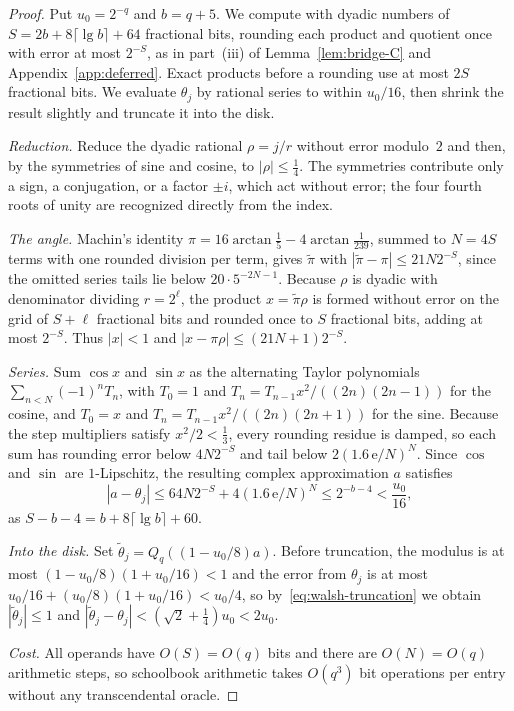 \begin{proof}
Put $u_0=2^{-q}$ and $b=q+5$. We compute with dyadic numbers of $S=2b+8\lceil\lg b\rceil+64$ fractional bits, rounding
each product and quotient once with error at most $2^{-S}$, as in part~(iii) of Lemma~\ref{lem:bridge-C} and
Appendix~\ref{app:deferred}. Exact products before a rounding use at most $2S$ fractional bits. We evaluate $\theta_j$
by rational series to within $u_0/16$, then shrink the result slightly and truncate it into the disk.

\emph{Reduction.} Reduce the dyadic rational $\rho=j/r$ without error modulo~$2$ and then, by the symmetries of sine and
cosine, to $|\rho|\le\frac14$. The symmetries contribute only a sign, a conjugation, or a factor $\pm i$, which act
without error; the four fourth roots of unity are recognized directly from the index.

\emph{The angle.} Machin's identity $\pi=16\arctan\frac15-4\arctan\frac1{239}$, summed to $N=4S$ terms with one rounded
division per term, gives $\tilde\pi$ with $|\tilde\pi-\pi|\le21N2^{-S}$, since the omitted series tails lie below
$20\cdot5^{-2N-1}$. Because $\rho$ is dyadic with denominator dividing $r=2^\ell$, the product $x=\tilde\pi\rho$ is
formed without error on the grid of $S+\ell$ fractional bits and rounded once to $S$ fractional bits, adding at most
$2^{-S}$. Thus $|x|<1$ and $|x-\pi\rho|\le(21N+1)2^{-S}$.

\emph{Series.} Sum $\cos x$ and $\sin x$ as the alternating Taylor polynomials $\sum_{n<N}(-1)^nT_n$, with $T_0=1$ and
$T_n=T_{n-1}x^2/((2n)(2n-1))$ for the cosine, and $T_0=x$ and $T_n=T_{n-1}x^2/((2n)(2n+1))$ for the sine. Because the
step multipliers satisfy $x^2/2<\frac13$, every rounding residue is damped, so each sum has rounding error below
$4N2^{-S}$ and tail below $2(1.6\,\mathrm e/N)^N$. Since $\cos$ and $\sin$ are $1$-Lipschitz, the resulting complex
approximation $a$ satisfies
\[
  |a-\theta_j|\le64N2^{-S}+4(1.6\,\mathrm e/N)^N\le2^{-b-4}<\frac{u_0}{16},
\]
as $S-b-4=b+8\lceil\lg b\rceil+60$.

\emph{Into the disk.} Set $\tilde\theta_j=Q_q((1-u_0/8)a)$. Before truncation, the modulus is at most
$(1-u_0/8)(1+u_0/16)<1$ and the error from $\theta_j$ is at most $u_0/16+(u_0/8)(1+u_0/16)<u_0/4$, so
by~\eqref{eq:walsh-truncation} we obtain $|\tilde\theta_j|\le1$ and
$|\tilde\theta_j-\theta_j|<(\sqrt2+\frac14)u_0<2u_0$.

\emph{Cost.} All operands have $O(S)=O(q)$ bits and there are $O(N)=O(q)$ arithmetic steps, so schoolbook arithmetic
takes $O(q^3)$ bit operations per entry without any transcendental oracle.
\end{proof}

